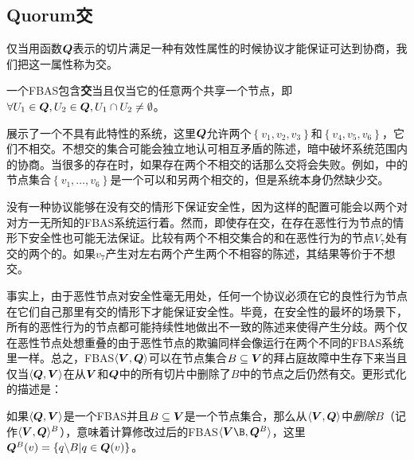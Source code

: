 \subsection{Quorum交}\label{sec:quorum_intersect}

仅当用函数${\bm Q}$表示的{\quorum}切片满足一种有效性属性的时候协议才能保证可达到协商，我们把这一属性称为{\quorum}交。

\begin{definition}[{\quorum}交]
	一个FBAS包含\textbf{{\quorum}交}当且仅当它的任意两个{\quorum}共享一个节点，即$\forall U_1\in{\bm Q},U_2\in{\bm Q},U_1\cap U_2\neq\emptyset$。
\end{definition}

展示了一个不具有此特性的系统，这里${\bm Q}$允许两个{\quorum}$\left\{v_1,v_2,v_3\right\}$和$\left\{v_4,v_5,v_6\right\}$，它们不相交。不想交的集合可能会独立地认可相互矛盾的陈述，暗中破坏系统范围内的协商。当很多的{\quorum}存在时，如果存在两个不相交的话那么{\quorum}交将会失败。例如，中的节点集合$\left\{v_1,\ldots ,v_6\right\}$是一个可以和另两个{\quorum}相交的{\quorum}，但是系统本身仍然缺少{\quorum}交。

没有一种协议能够在没有{\quorum}交的情形下保证安全性，因为这样的配置可能会以两个对对方一无所知的FBAS系统运行着。然而，即使存在{\quorum}交，在存在恶性行为节点的情形下安全性也可能无法保证。比较有两个不相交集合的和在恶性行为的节点$V_7$处有交的两个{\quorum}的。如果$v_7$产生对左右两个{\quorum}产生两个不相容的陈述，其结果等价于不想交{\quorum}。

事实上，由于恶性节点对安全性毫无用处，任何一个协议必须在它的良性行为节点在它们自己那里有{\quorum}交的情形下才能保证安全性。毕竟，在安全性的最坏的场景下，所有的恶性行为的节点都可能持续性地做出不一致的陈述来使得{\quorum}产生分歧。两个仅在恶性节点处想重叠的{\quorum}由于恶性节点的欺骗同样会像运行在两个不同的FBAS系统里一样。总之，FBAS$\langle {\bm V},{\bm Q}\rangle$可以在节点集合$B\subseteq {\bm V}$的拜占庭故障中生存下来当且仅当$\langle{\bm Q},{\bm V}\rangle$在从${\bm V}$和${\bm Q}$中的所有切片中删除了$B$中的节点之后仍然有{\quorum}交。更形式化的描述是：

\begin{definition}[删除]
	如果$\langle{\bm Q},{\bm V}\rangle$是一个FBAS并且$B\subseteq {\bm V}$是一个节点集合，那么从$\langle{\bm V},{\bm Q}\rangle$中\textit{删除}$B$（记作$\langle{\bm V},{\bm Q}\rangle^B$），意味着计算修改过后的FBAS$\langle\mybm{V}\B, \mybm{Q}^B\rangle$，这里${\bm Q}^B(v)=\left\{q\backslash B|q\in{\bm Q(v)}\right\}$。
\end{definition}

